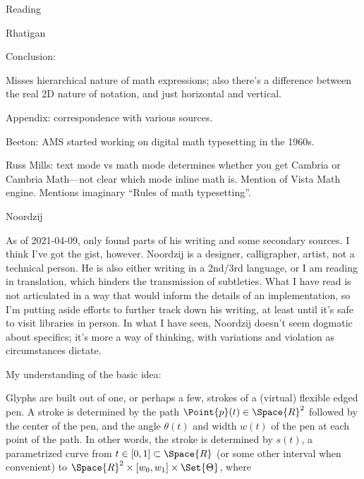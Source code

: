 \documentclass[11pt]{PalisadesLakesBook}
\begin{document}
\begin{plSection}{Reading}
\begin{plSection}{Rhatigan}
\begin{plSection}{}
\begin{plSection}{}
Conclusion:

Misses hierarchical nature of math expressions;
also there's a difference between the real 2D nature of notation,
and just horizontal and vertical.

Appendix: correspondence with various sources.

Beeton: AMS started working on digital math typesetting in the 1960s.

Russ Mills: text mode vs math mode determines whether
you get Cambria or Cambria Math---not clear which mode inline math is.
Mention of Vista Math engine. 
Mentions imaginary ``Rules of math typesetting''.

\end{plSection}%
\end{plSection}%
\end{plSection}%
\begin{plSection}{Noordzij}

As of 2021-04-09, only found parts of his writing
and some secondary sources.
I think I've got the gist, however.
Noordzij is a designer, calligrapher, artist, not a technical
person. 
He is also either writing in a 2nd/3rd language,
or I am reading in translation,
which hinders the transmission of subtleties.
What I have read is not articulated in a way that would inform 
the details of an implementation, so I'm putting aside efforts
to further track down his writing, at least until it's 
safe to visit libraries in person.
In what I have seen, Noordzij doesn't seem dogmatic 
about specifics;
it's more a way of thinking, with variations and violation
as circumstances dictate.

My understanding of the basic idea:

Glyphs are built out of one, or perhaps a few, strokes 
of a (virtual) flexible edged pen.
A stroke is determined by the path $\Point{p}(t) \in \Space{R}^2$
followed by the center of the pen,
and the angle $\theta(t)$ and width $w(t)$
of the pen at each point of the path.
In other words, the stroke is determined 
by $s(t)$, a parametrized curve 
from $t \in \left[ 0, 1 \right] \subset \Space{R}$
(or some other interval when convenient)
to $\Space{R}^2 \times 
\left[ w_{0}, w_{1} \right] 
\times \Set{\Theta}$,
where 
\begin{itemize}


\end{itemize}
\end{plSection}
\end{plSection}
\end{document}
